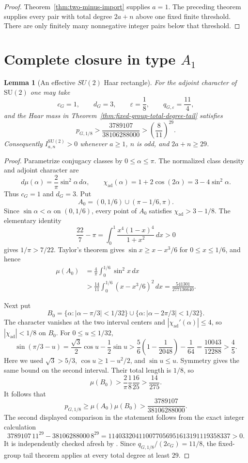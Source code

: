 \documentclass[11pt,reqno]{amsart}
\theoremstyle{plain}
\newtheorem{lemma}[theorem]{Lemma}
\theoremstyle{definition}
\newcommand{\chiad}{\chi_{\mathrm{ad}}}
\begin{document}
\begin{proof}
Theorem~\ref{thm:two-minus-import} supplies $a=1$.  The preceding theorem supplies every
pair with total degree $2a+n$ above one fixed finite threshold.  There are
only finitely many nonnegative integer pairs below that threshold.
\end{proof}

\section{Complete closure in type \texorpdfstring{$A_1$}{A1}}

\begin{lemma}[An effective $SU(2)$ Haar rectangle]
\label{lem:su2-effective-rectangle}
For the adjoint character of $\mathrm{SU}(2)$ one may take
\[
 c_G=1,\qquad d_G=3,\qquad \varepsilon=\frac18,
 \qquad q_{G,\varepsilon}=\frac{11}{4},
\]
and the Haar mass in Theorem~\ref{thm:fixed-group-total-degree-tail}
satisfies
\[
 p_{G,1/8}>
 \frac{3789107}{38106288000}>
 \left(\frac8{11}\right)^{29}.
\]
Consequently $I^{\mathrm{SU}(2)}_{a,n}>0$ whenever $a\geq1$, $n$ is odd,
and $2a+n\geq29$.
\end{lemma}

\begin{proof}
Parametrize conjugacy classes by $0\leq\alpha\leq\pi$.  The normalized
class density and adjoint character are
\[
 d\mu(\alpha)=\frac2\pi\sin^2\alpha\,d\alpha,
 \qquad
 \chiad(\alpha)=1+2\cos(2\alpha)=3-4\sin^2\alpha.
\]
Thus $c_G=1$ and $d_G=3$.  Put
\[
 A_0=(0,1/6)\cup(\pi-1/6,\pi).
\]
Since $\sin\alpha<\alpha$ on $(0,1/6)$, every point of $A_0$ satisfies
$\chiad>3-1/8$.  The elementary identity
\[
 \frac{22}{7}-\pi
 =\int_0^1\frac{x^4(1-x)^4}{1+x^2}\,dx>0
\]
gives $1/\pi>7/22$.  Taylor's theorem gives
$\sin x\geq x-x^3/6$ for $0\leq x\leq1/6$, and hence
\[
 \begin{aligned}
 \mu(A_0)
 &=\frac4\pi\int_0^{1/6}\sin^2x\,dx\\
 &>\frac{14}{11}\int_0^{1/6}(x-x^3/6)^2\,dx
 =\frac{541301}{277136640}.
 \end{aligned}
\]

Next put
\[
 B_0=\{\alpha:|\alpha-\pi/3|<1/32\}
 \cup\{\alpha:|\alpha-2\pi/3|<1/32\}.
\]
The character vanishes at the two interval centers and
$|\chiad'(\alpha)|\leq4$, so $|\chiad|<1/8$ on $B_0$.  For
$0\leq u\leq1/32$,
\[
 \sin(\pi/3-u)
 =\frac{\sqrt3}{2}\cos u-\frac12\sin u
 >\frac56\left(1-\frac1{2048}\right)-\frac1{64}
 =\frac{10043}{12288}>\frac45.
\]
Here we used $\sqrt3>5/3$, $\cos u\geq1-u^2/2$, and $\sin u\leq u$.
Symmetry gives the same bound on the second interval.  Their total length is
$1/8$, so
\[
 \mu(B_0)>
 \frac2\pi\frac18\frac{16}{25}>\frac{14}{275}.
\]
It follows that
\[
 p_{G,1/8}\geq\mu(A_0)\mu(B_0)
 >\frac{3789107}{38106288000}.
\]
The second displayed comparison in the statement follows from the exact
integer calculation
\[
 3789107\,11^{29}-38106288000\,8^{29}
 =114033204110077056951613191119358337>0.
\]
It is independently checked afresh by
.  Since
$q_{G,1/8}/(2c_G)=11/8$, the fixed-group tail theorem applies at every total
degree at least $29$.
\end{proof}
\end{document}
